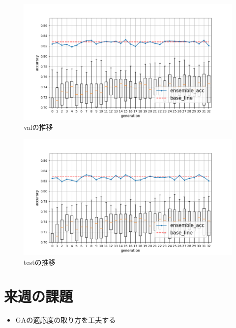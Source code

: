 \documentclass[twocolumn]{jarticle}     %
\begin{document}
\begin{figure}[hp]
	\centering
	\includegraphics[scale=0.6]{graph1.png}
	\caption{valの推移\label{fig:trans1}}
\end{figure}

\begin{figure}[h]
	\centering
	\includegraphics[scale=0.6]{graph2.png}
	\caption{testの推移\label{fig:trans2}}
\end{figure}


\section{来週の課題}
\begin{itemize}
	\item GAの適応度の取り方を工夫する
\end{itemize}



\end{document}
